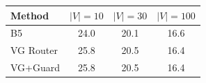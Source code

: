 \begin{tabular}{lccc}
\toprule
Method & $|V|{=}10$ & $|V|{=}30$ & $|V|{=}100$ \\
\midrule
B5 & 24.0 & 20.1 & 16.6 \\
VG Router & 25.8 & 20.5 & 16.4 \\
VG+Guard & 25.8 & 20.5 & 16.4 \\
\bottomrule
\end{tabular}
